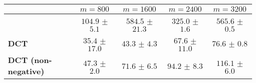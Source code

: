\centering
\renewcommand{\arraystretch}{1.2}
\begin{tabular}{@{}lcccc@{}}
\toprule
 & $m=800$ & $m=1600$ & $m=2400$ & $m=3200$\\
\midrule
\cite[algorithm 1]{lin-2017-randomized-estimation} & $104.9$ $\pm$ $5.1$ & $584.5$ $\pm$ $21.3$ & $325.0$ $\pm$ $1.6$ & $565.6$ $\pm$ $0.5$ \\
\textbf{DCT} & $35.4$ $\pm$ $17.0$ & $43.3$ $\pm$ $4.3$ & $67.6$ $\pm$ $11.0$ & $76.6$ $\pm$ $0.8$ \\
\textbf{DCT (non-negative)} & $47.3$ $\pm$ $2.0$ & $71.6$ $\pm$ $6.5$ & $94.2$ $\pm$ $8.3$ & $116.1$ $\pm$ $6.0$ \\
\bottomrule
\end{tabular}
